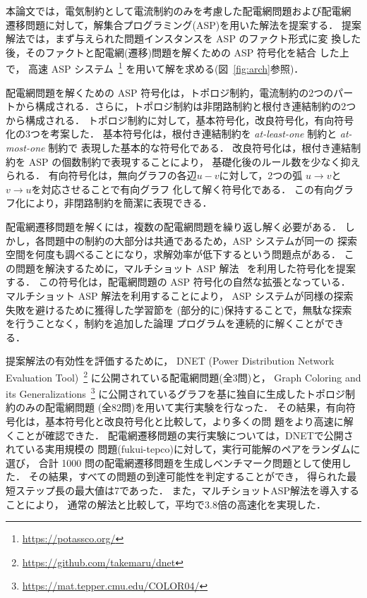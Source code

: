 \begin{figure*}[t]
 \centering
 \scalebox{0.85}{}
 \caption{提案解法の概要図}
 \label{fig:arch}
\end{figure*}

本論文では，電気制約として電流制約のみを考慮した配電網問題および配電網
遷移問題に対して，解集合プログラミング(ASP)を用いた解法を提案する．
提案解法では，まず与えられた問題インスタンスを ASP のファクト形式に変
換した後，そのファクトと配電網(遷移)問題を解くための ASP 符号化を結合
した上で，
高速 ASP システム{\clingo}~\footnote{\url{https://potassco.org/}}
を用いて解を求める(図~\ref{fig:arch}参照)．

配電網問題を解くための ASP 符号化は，トポロジ制約，電流制約の2つのパー
トから構成される．さらに，トポロジ制約は非閉路制約と根付き連結制約の2つ
から構成される．
トポロジ制約に対して，基本符号化，改良符号化，有向符号化の3つを考案した．
基本符号化は，根付き連結制約を \textit{at-least-one} 制約と \textit{at-most-one} 制約で
表現した基本的な符号化である．
改良符号化は，根付き連結制約を ASP の個数制約で表現することにより，
基礎化後のルール数を少なく抑えられる．
有向符号化は，無向グラフの各辺$u-v$に対して，2つの弧
$u\rightarrow v$と$v\rightarrow u$を対応させることで有向グラフ
化して解く符号化である．
この有向グラフ化により，非閉路制約を簡潔に表現できる．

配電網遷移問題を解くには，複数の配電網問題を繰り返し解く必要がある．
しかし，各問題中の制約の大部分は共通であるため，ASP システムが同一の
探索空間を何度も調べることになり，求解効率が低下するという問題点がある．
この問題を解決するために，マルチショット ASP 解法~\cite{DBLP:conf/rweb/KaminskiSW17}
を利用した符号化を提案する．
この符号化は，配電網問題の ASP 符号化の自然な拡張となっている．
マルチショット ASP 解法を利用することにより，
ASP システムが同様の探索失敗を避けるために獲得した学習節を
(部分的に)保持することで，無駄な探索を行うことなく，制約を追加した論理
プログラムを連続的に解くことができる．



提案解法の有効性を評価するために，
DNET (Power Distribution Network Evaluation Tool)~\footnote{%
\url{https://github.com/takemaru/dnet}}
に公開されている配電網問題(全3問)と，
Graph Coloring and its Generalizations~\footnote{%
\url{https://mat.tepper.cmu.edu/COLOR04/}}
に公開されているグラフを基に独自に生成したトポロジ制約のみの配電網問題
(全82問)を用いて実行実験を行なった．
その結果，有向符号化は，基本符号化と改良符号化と比較して，より多くの問
題をより高速に解くことが確認できた．
%
配電網遷移問題の実行実験については，DNETで公開されている実用規模の
問題({\sf fukui-tepco})に対して，実行可能解のペアをランダムに選び，
合計 1000 問の配電網遷移問題を生成しベンチマーク問題として使用した．
その結果，すべての問題の到達可能性を判定することができ，
得られた最短ステップ長の最大値は7であった．
また，マルチショットASP解法を導入することにより，
通常の解法と比較して，平均で3.8倍の高速化を実現した．

